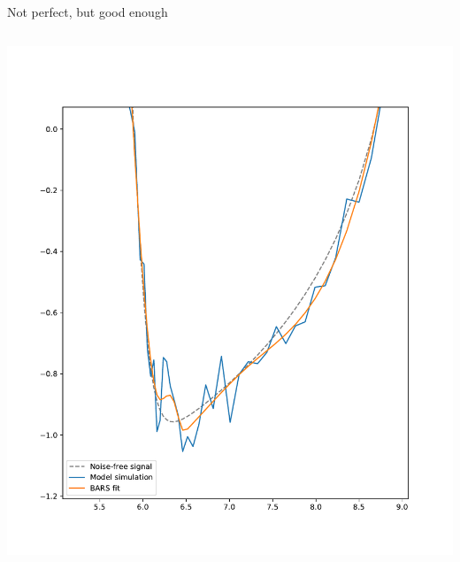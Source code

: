 \documentclass[presentation]{beamer}
\begin{document}
\begin{frame}[plain,label={sec:org38c56f4}]{Not perfect, but good enough}
\begin{columns}
\begin{column}{0.5\columnwidth}
\begin{center}
\includegraphics[width=1.1\textwidth]{./barsbad2.pdf}
\end{center}
\end{column}
\end{columns}
\end{frame}
\end{document}

